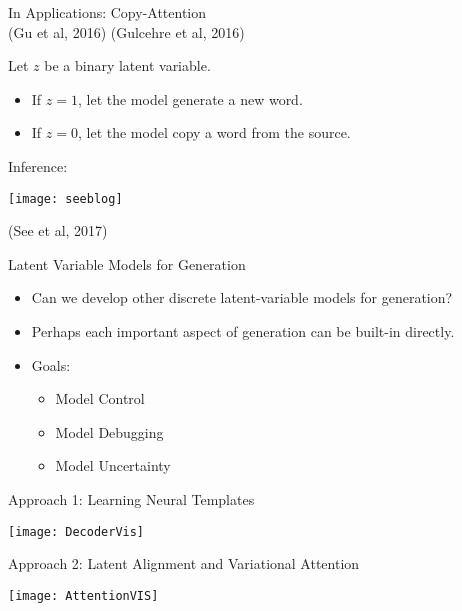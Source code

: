 \begin{frame}{ In Applications: Copy-Attention \\
      \small{(Gu et al, 2016) (Gulcehre et al, 2016)}}

Let $z$ be a binary latent variable.
\air
\begin{itemize}
\item If $z = 1$, let the model generate a new word.
\item If $z = 0$, let the model copy a word from the source.
\end{itemize}

Inference:
\begin{center}


\texttt{[image: seeblog]}

\centerline{\small (See et al, 2017)}
\end{center}
\end{frame}


\begin{frame}{ Latent Variable Models for Generation}

  \begin{itemize}
  \item Can we develop other discrete latent-variable models for generation?
    \air
  \item Perhaps each important aspect of generation can be built-in directly.
    \air
  \item Goals:
    \begin{itemize}
    \item Model Control
    \item Model Debugging
    \item Model Uncertainty
    \end{itemize}
  \end{itemize}
\end{frame}





\begin{frame}{Approach 1: Learning Neural Templates}

  \begin{center}
    \texttt{[image: DecoderVis]}
  \end{center}
\end{frame}

\begin{frame}{Approach 2: Latent Alignment and Variational Attention}
  \begin{center}
    \texttt{[image: AttentionVIS]}
  \end{center}
\end{frame}


